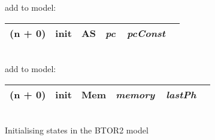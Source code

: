 \begin{algorithm}
    add to model:\\
    \begin{tabular}[h]{>{\ttfamily\color{UniRed}}r >{\ttfamily}l >{\ttfamily\color{UniGrey}}l >{\slshape\color{UniRed}}l >{\slshape} l}
        \hline
        \hline
        \ttfamily
        (n + 0) & init & AS & pc\ \ pcConst & \\
        \hline
        \hline
    \end{tabular}\\
    \BlankLine
    \BlankLine
    add to model:\\
    \begin{tabular}[h]{>{\ttfamily\color{UniRed}}r >{\ttfamily}l >{\ttfamily\color{UniGrey}}l >{\slshape\color{UniRed}}l >{\slshape} l}
        \hline
        \hline
        \ttfamily
        (n + 0) & init & Mem & memory\ \ lastPh & \\
        \hline
        \hline
    \end{tabular}\\
    \caption[Initialising states]{Initialising states in the BTOR2 model}\label{alg:initstate}
\end{algorithm}